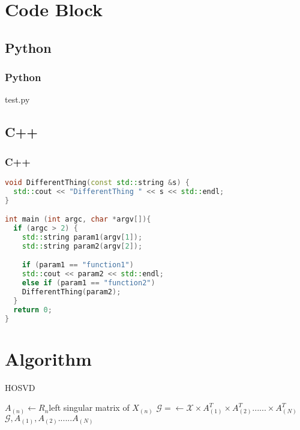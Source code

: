 \section{Code Block}

\subsection{Python}
\begin{frame}
  \frametitle{Python}
  
  {test.py}
\end{frame}

\subsection{C++}
\begin{frame}[fragile]
  \frametitle{C++}
  \begin{lstlisting}[language=c++,frame=single,label=c++,caption={C++ Code}]
void DifferentThing(const std::string &s) {
  std::cout << "DifferentThing " << s << std::endl;
}

int main (int argc, char *argv[]){
  if (argc > 2) {
    std::string param1(argv[1]);
    std::string param2(argv[2]);

    if (param1 == "function1")
    std::cout << param2 << std::endl;
    else if (param1 == "function2")
    DifferentThing(param2);
  }
  return 0;
}
  \end{lstlisting}
\end{frame}

\section{Algorithm}

\begin{frame}
  \begin{algorithm}[H]
    \caption{HOSVD}
    \small

    {
      $A_{(n)}\leftarrow R_{n}$left singular matrix of $X_{(n)}$
    }
    $\mathcal{G}=\leftarrow \mathcal{X} \times A_{(1)}^{T} \times A_{(2)}^{T}...... \times A_{(N)}^{T}$\\
    \Return $\mathcal{G},A_{(1)},A_{(2)}......A_{(N)} $
  \end{algorithm}
\end{frame}